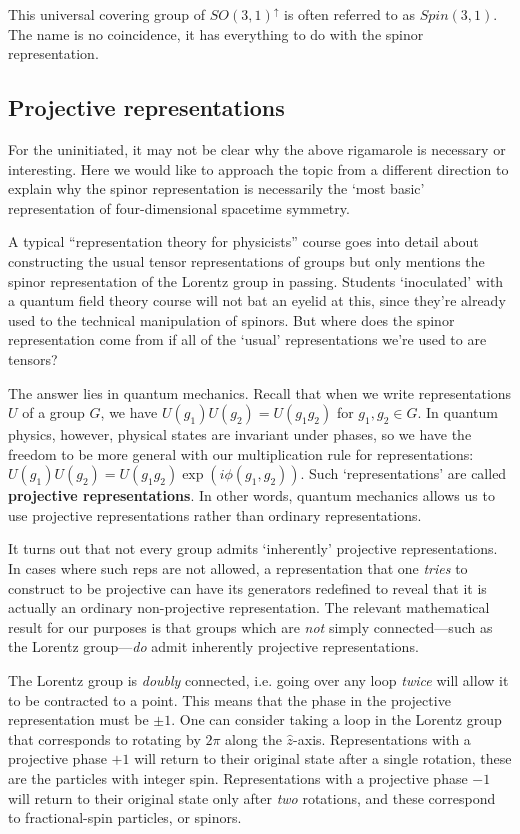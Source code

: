 This universal covering group of $SO(3,1)^\uparrow$ is often referred to as $Spin(3,1)$. The name is no coincidence, it has everything to do with the spinor representation.


\subsection{Projective representations}\label{sec:SUSYalg:projective}

For the uninitiated, it may not be clear why the above rigamarole is necessary or  interesting. Here we would like to approach the topic from a different direction to explain why the spinor representation is necessarily the `most basic' representation of four-dimensional spacetime symmetry.
    
A typical ``representation theory for physicists'' course goes into detail about constructing the usual tensor representations of groups but only mentions the spinor representation of the Lorentz group in passing. Students `inoculated' with a quantum field theory course will not bat an eyelid at this, since they're already used to the technical manipulation of spinors. But where does the spinor representation come from if all of the `usual' representations we're used to are tensors?
    
 The answer lies in quantum mechanics. Recall that when we write representations $U$ of a group $G$, we have $U(g_1)U(g_2) = U(g_1g_2)$ for $g_1, g_2 \in G$. In quantum physics, however, physical states are invariant under phases, so we have the freedom to be more general with our multiplication rule for representations: $U(g_1)U(g_2) = U(g_1g_2)\exp({i\phi(g_1,g_2)})$. Such `representations' are called \textbf{projective representations}. In other words, quantum mechanics allows us to use projective representations rather than ordinary representations. 
    
It turns out that not every group admits `inherently' projective representations. In cases where such reps are not allowed, a representation that one \textit{tries} to construct to be projective can have its generators redefined to reveal that it is actually an ordinary non-projective representation. The relevant mathematical result for our purposes is that groups which are \textit{not} simply connected---such as the Lorentz group---\textit{do} admit inherently projective representations. 
    
The Lorentz group is \textit{doubly} connected, i.e. going over any loop \textit{twice} will allow it to be contracted to a point. This means that the phase in the projective representation must be $\pm 1$. One can consider taking a loop in the Lorentz group that corresponds to rotating by $2\pi$ along the $\hat z$-axis. Representations with a projective phase $+1$ will return to their original state after a single rotation, these are the particles with integer spin. Representations with a projective phase $-1$ will return to their original state only after \textit{two} rotations, and these correspond to fractional-spin particles, or spinors. 
    
